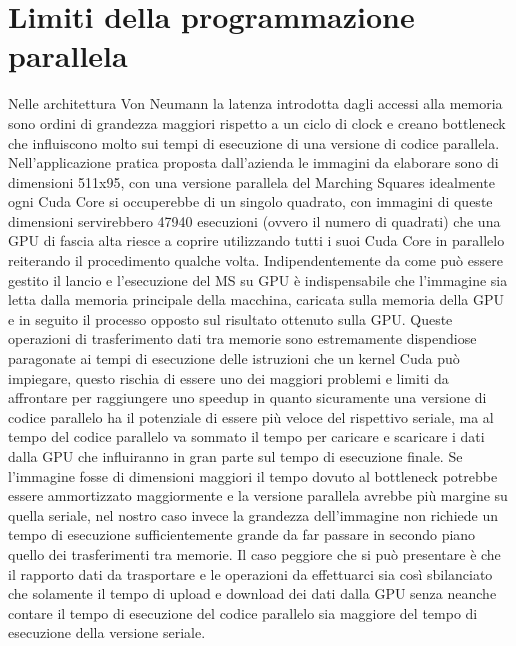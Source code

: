 \documentclass[12pt,a4paper]{report}
\begin{document}
\section{Limiti della programmazione parallela}
Nelle architettura Von Neumann la latenza introdotta dagli accessi alla memoria sono ordini di grandezza maggiori rispetto a un ciclo di clock e creano bottleneck che influiscono molto sui tempi di esecuzione di una versione di codice parallela.
Nell'applicazione pratica proposta dall'azienda le immagini da elaborare sono di dimensioni 511x95, con una versione parallela del Marching Squares idealmente ogni Cuda Core si occuperebbe di un singolo quadrato, con immagini di queste dimensioni servirebbero 47940 esecuzioni (ovvero il numero di quadrati) che una GPU di fascia alta riesce a coprire utilizzando tutti i suoi Cuda Core in parallelo reiterando il procedimento qualche volta. \newline
Indipendentemente da come può essere gestito il lancio e l'esecuzione del MS su GPU è indispensabile che l'immagine sia letta dalla memoria principale della macchina, caricata sulla memoria della GPU e in seguito il processo opposto sul risultato ottenuto sulla GPU.
Queste operazioni di trasferimento dati tra memorie sono estremamente dispendiose paragonate ai tempi di esecuzione delle istruzioni che un kernel Cuda può impiegare, questo rischia di essere uno dei maggiori problemi e limiti da affrontare per raggiungere uno speedup in quanto sicuramente una versione di codice parallelo ha il potenziale di essere più veloce del rispettivo seriale, ma al tempo del codice parallelo va sommato il tempo per caricare e scaricare i dati dalla GPU che influiranno in gran parte sul tempo di esecuzione finale. \newline
Se l'immagine fosse di dimensioni maggiori il tempo dovuto al bottleneck potrebbe essere ammortizzato maggiormente e la versione parallela avrebbe più margine su quella seriale, nel nostro caso invece la grandezza dell'immagine non richiede un tempo di esecuzione sufficientemente grande da far passare in secondo piano quello dei trasferimenti tra memorie. \newline
Il caso peggiore che si può presentare è che il rapporto dati da trasportare e le operazioni da effettuarci sia così sbilanciato che solamente il tempo di upload e download dei dati dalla GPU senza neanche contare il tempo di esecuzione del codice parallelo sia maggiore del tempo di esecuzione della versione seriale.
\end{document}
